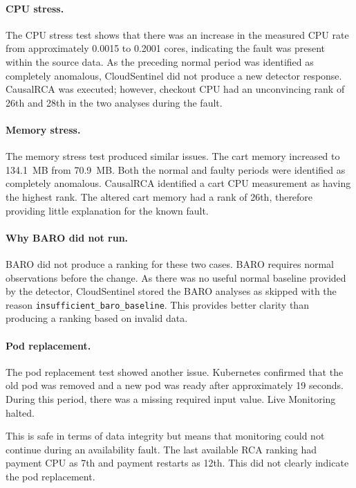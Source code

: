\paragraph{CPU stress.}
The CPU stress test shows that there was an increase in the measured CPU rate from approximately 0.0015 to 0.2001 cores, indicating the fault was present within the source data. As the preceding normal period was identified as completely anomalous, CloudSentinel did not produce a new detector response. CausalRCA was executed; however, checkout CPU had an unconvincing rank of 26th and 28th in the two analyses during the fault.

\paragraph{Memory stress.}

The memory stress test produced similar issues. The cart memory increased to 134.1~MB from 70.9~MB. Both the normal and faulty periods were identified as completely anomalous. CausalRCA identified a cart CPU measurement as having the highest rank. The altered cart memory had a rank of 26th, therefore providing little explanation for the known fault.

\paragraph{Why BARO did not run.}

BARO did not produce a ranking for these two cases. BARO requires normal observations before the change. As there was no useful normal baseline provided by the detector, CloudSentinel stored the BARO analyses as skipped with the reason \texttt{insufficient\_baro\_baseline}. This provides better clarity than producing a ranking based on invalid data.

\paragraph{Pod replacement.}

The pod replacement test showed another issue. Kubernetes confirmed that the old pod was removed and a new pod was ready after approximately 19 seconds. During this period, there was a missing required input value. Live Monitoring halted.

This is safe in terms of data integrity but means that monitoring could not continue during an availability fault. The last available RCA ranking had payment CPU as 7th and payment restarts as 12th. This did not clearly indicate the pod replacement.

